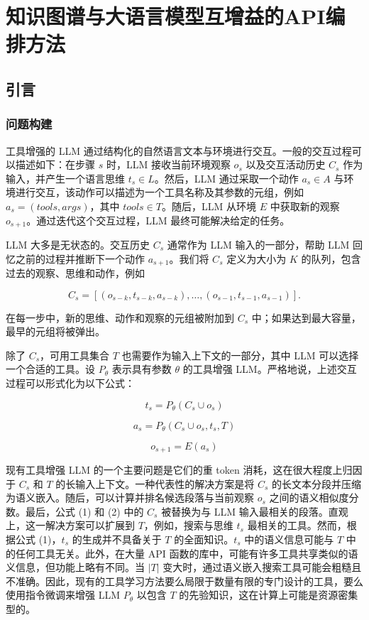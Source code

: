\chapter{知识图谱与大语言模型互增益的API编排方法}

\section{引言}
\label{sec:intro}

\subsection{问题构建}

工具增强的 LLM 通过结构化的自然语言文本与环境进行交互。一般的交互过程可以描述如下：在步骤 \( s \) 时，LLM 接收当前环境观察 \( o_s \) 以及交互活动历史 \( C_s \) 作为输入，并产生一个语言思维 \( t_s \in L \)。然后，LLM 通过采取一个动作 \( a_s \in A \) 与环境进行交互，该动作可以描述为一个工具名称及其参数的元组，例如 \( a_s = (tools, args) \)，其中 \( tools \in T \)。随后，LLM 从环境 \( E \) 中获取新的观察 \( o_{s+1} \)。通过迭代这个交互过程，LLM 最终可能解决给定的任务。

LLM 大多是无状态的。交互历史 \( C_s \) 通常作为 LLM 输入的一部分，帮助 LLM 回忆之前的过程并推断下一个动作 \( a_{s+1} \)。我们将 \( C_s \) 定义为大小为 \( K \) 的队列，包含过去的观察、思维和动作，例如 

\[
C_s = [(o_{s-k}, t_{s-k}, a_{s-k}), \ldots, (o_{s-1}, t_{s-1}, a_{s-1})].
\]

在每一步中，新的思维、动作和观察的元组被附加到 \( C_s \) 中；如果达到最大容量，最早的元组将被弹出。

除了 \( C_s \)，可用工具集合 \( T \) 也需要作为输入上下文的一部分，其中 LLM 可以选择一个合适的工具。设 \( P_\theta \) 表示具有参数 \( \theta \) 的工具增强 LLM。严格地说，上述交互过程可以形式化为以下公式：

\[
t_s = P_\theta(C_s \cup o_s) \tag{1}
\]

\[
a_s = P_\theta(C_s \cup o_s, t_s, T) \tag{2}
\]

\[
o_{s+1} = E(a_s) \tag{3}
\]

现有工具增强 LLM 的一个主要问题是它们的重 token 消耗，这在很大程度上归因于 \( C_s \) 和 \( T \) 的长输入上下文。一种代表性的解决方案是将 \( C_s \) 的长文本分段并压缩为语义嵌入。随后，可以计算并排名候选段落与当前观察 \( o_s \) 之间的语义相似度分数。最后，公式 (1) 和 (2) 中的 \( C_s \) 被替换为与 LLM 输入最相关的段落。直观上，这一解决方案可以扩展到 \( T \)，例如，搜索与思维 \( t_s \) 最相关的工具。然而，根据公式 (1)，\( t_s \) 的生成并不具备关于 \( T \) 的全面知识。\( t_s \) 中的语义信息可能与 \( T \) 中的任何工具无关。此外，在大量 API 函数的库中，可能有许多工具共享类似的语义信息，但功能上略有不同。当 \( |T| \) 变大时，通过语义嵌入搜索工具可能会粗糙且不准确。因此，现有的工具学习方法要么局限于数量有限的专门设计的工具，要么使用指令微调来增强 LLM \( P_\theta \) 以包含 \( T \) 的先验知识，这在计算上可能是资源密集型的。

